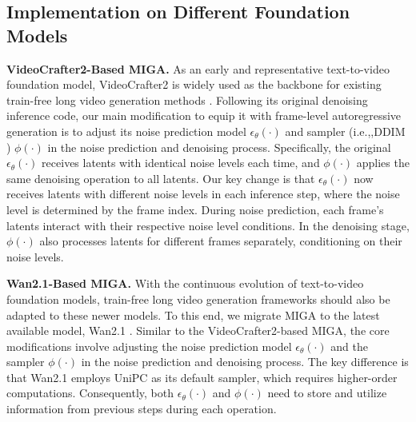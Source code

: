 \documentclass{llmxive}
\providecommand{\ie}{i.e.,\xspace}
\begin{document}
\subsection{Implementation on Different Foundation Models}
\label{app:imple_different_models}
\textbf{VideoCrafter2-Based MIGA.}
As an early and representative text-to-video foundation model, VideoCrafter2 \cite{chen2023videocrafter1,chen2024videocrafter2} is widely used as the backbone for existing train-free long video generation methods \cite{qiu2023freenoise,tan2025freepca,lu2024freelong,kim2024fifo,yang2025scalingnoise}.
Following its original denoising inference code, our main modification to equip it with frame-level autoregressive generation is to adjust its noise prediction model $\epsilon_{\theta}(\cdot)$ and sampler (\ie,DDIM \cite{song2020denoising}) $\phi(\cdot)$ in the noise prediction and denoising process.
Specifically, the original $\epsilon_{\theta}(\cdot)$ receives latents with identical noise levels each time, and $\phi(\cdot)$ applies the same denoising operation to all latents.
Our key change is that $\epsilon_{\theta}(\cdot)$ now receives latents with different noise levels in each inference step, where the noise level is determined by the frame index.
During noise prediction, each frame’s latents interact with their respective noise level conditions.  
In the denoising stage, $\phi(\cdot)$ also processes latents for different frames separately, conditioning on their noise levels.



\textbf{Wan2.1-Based MIGA.}
With the continuous evolution of text-to-video foundation models, train-free long video generation frameworks should also be adapted to these newer models.
To this end, we migrate MIGA to the latest available model, Wan2.1 \cite{wan2025wan}. 
Similar to the VideoCrafter2-based MIGA, the core modifications involve adjusting the noise prediction model $\epsilon_{\theta}(\cdot)$ and the sampler $\phi(\cdot)$ in the noise prediction and denoising process.
The key difference is that Wan2.1 employs UniPC \cite{zhao2023unipc} as its default sampler, which requires higher-order computations. Consequently, both $\epsilon_{\theta}(\cdot)$ and $\phi(\cdot)$ need to store and utilize information from previous steps during each operation.
\end{document}
